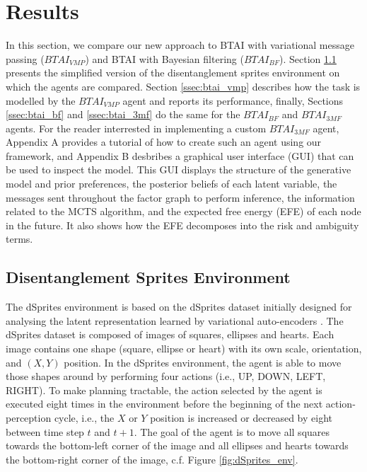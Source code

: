 \documentclass[twoside,11pt]{article}
\begin{document}
\section{Results} \label{sec:results}

In this section, we compare our new approach to BTAI with variational message passing ($BTAI_{VMP}$) and BTAI with Bayesian filtering ($BTAI_{BF}$). Section \ref{ssec:dsprites} presents the simplified version of the disentanglement sprites environment on which the agents are compared. Section \ref{ssec:btai_vmp} describes how the task is modelled by the $BTAI_{VMP}$ agent and reports its performance, finally, Sections \ref{ssec:btai_bf} and \ref{ssec:btai_3mf} do the same for the $BTAI_{BF}$ and $BTAI_{3MF}$ agents. For the reader interrested in implementing a custom $BTAI_{3MF}$ agent, Appendix A provides a tutorial of how to create such an agent using our framework, and Appendix B desbribes a graphical user interface (GUI) that can be used to inspect the model. This GUI displays the structure of the generative model and prior preferences, the posterior beliefs of each latent variable, the messages sent throughout the factor graph to perform inference, the information related to the MCTS algorithm, and the expected free energy (EFE) of each node in the future. It also shows how the EFE decomposes into the risk and ambiguity terms.

\subsection{Disentanglement Sprites Environment} \label{ssec:dsprites}

The dSprites environment is based on the dSprites dataset \citep{dsprites17} initially designed for analysing the latent representation learned by variational auto-encoders \citep{VAE}. The dSprites dataset is composed of images of squares, ellipses and hearts. Each image contains one shape (square, ellipse or heart) with its own scale, orientation, and $(X,Y)$ position. In the dSprites environment, the agent is able to move those shapes around by performing four actions (i.e., UP, DOWN, LEFT, RIGHT). To make planning tractable, the action selected by the agent is executed eight times in the environment before the beginning of the next action-perception cycle, i.e., the $X$ or $Y$ position is increased or decreased by eight between time step $t$ and $t+1$. The goal of the agent is to move all squares towards the bottom-left corner of the image and all ellipses and hearts towards the bottom-right corner of the image, c.f. Figure \ref{fig:dSprites_env}.
\end{document}
